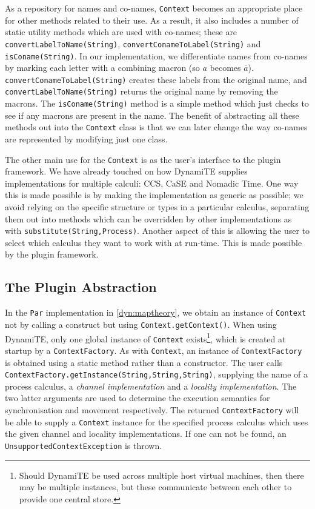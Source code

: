 As a repository for names and co-names, \texttt{Context} becomes an
appropriate place for other methods related to their use.  As a
result, it also includes a number of static utility methods which are
used with co-names; these are \texttt{convertLabelToName(String)},
\texttt{convertConameToLabel(String)} and \texttt{isConame(String)}.
In our implementation, we differentiate names from co-names by marking
each letter with a combining macron (so $a$ becomes $\overline{a}$).
\texttt{convertConameToLabel(String)} creates these labels from the
original name, and \texttt{convertLabelToName(String)} returns the
original name by removing the macrons.  The \texttt{isConame(String)}
method is a simple method which just checks to see if any macrons are
present in the name.  The benefit of abstracting all these methods out
into the \texttt{Context} class is that we can later change the way
co-names are represented by modifying just one class.

The other main use for the \texttt{Context} is as the user's interface
to the plugin framework.  We have already touched on how DynamiTE
supplies implementations for multiple calculi: CCS, CaSE and Nomadic
Time.  One way this is made possible is by making the implementation
as generic as possible; we avoid relying on the specific structure or
types in a particular calculus, separating them out into methods which
can be overridden by other implementations as with
\texttt{substitute(String,Process)}.  Another aspect of this is
allowing the user to select which calculus they want to work with at
run-time.  This is made possible by the plugin framework.

\subsection{The Plugin Abstraction}
\label{dyn:plugin}

In the \texttt{Par} implementation in \ref{dyn:maptheory}, we obtain
an instance of \texttt{Context} not by calling a construct but using
\texttt{Context.getContext()}.  When using DynamiTE, only one global
instance of \texttt{Context} exists\footnote{Should DynamiTE be used
  across multiple host virtual machines, then there may be multiple
  instances, but these communicate between each other to provide one
  central store.}, which is created at startup by a
\texttt{ContextFactory}.  As with \texttt{Context}, an instance of
\texttt{ContextFactory} is obtained using a static method rather than
a constructor.  The user calls
\texttt{ContextFactory.getInstance(String,String,String)}, supplying
the name of a process calculus, a \emph{channel implementation} and a
\emph{locality implementation}.  The two latter arguments are used to
determine the execution semantics for synchronisation and movement
respectively.  The returned \texttt{ContextFactory} will be able to
supply a \texttt{Context} instance for the specified process calculus
which uses the given channel and locality implementations.  If one can
not be found, an \texttt{UnsupportedContextException} is thrown.

